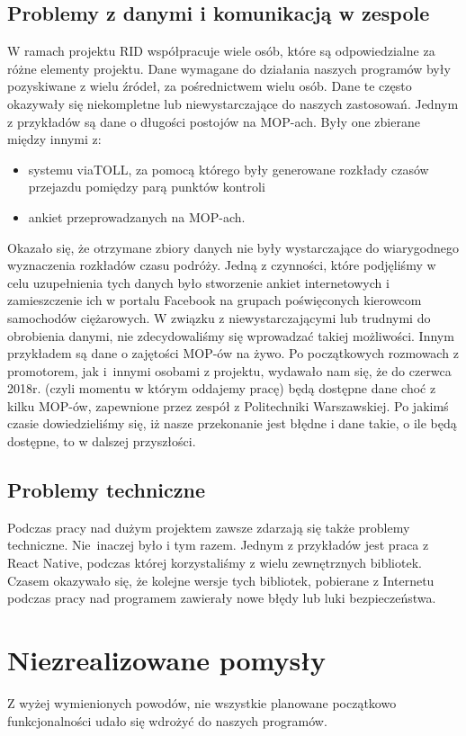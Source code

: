 \subsection{Problemy z danymi i komunikacją w zespole}
W ramach projektu RID współpracuje wiele osób, które są odpowiedzialne za różne elementy projektu. 
Dane wymagane do działania naszych programów były pozyskiwane z wielu źródeł, za pośrednictwem wielu osób. Dane te często okazywały się niekompletne lub niewystarczające do naszych zastosowań.
Jednym z przykładów są dane o długości postojów na MOP-ach. Były one zbierane między innymi z:
\begin{itemize}
\item systemu viaTOLL, za pomocą którego były generowane rozkłady czasów przejazdu pomiędzy parą punktów kontroli
\item ankiet przeprowadzanych na MOP-ach. 
\end{itemize}
Okazało się, że otrzymane zbiory danych nie były wystarczające do wiarygodnego wyznaczenia rozkładów czasu podróży. Jedną z czynności, które podjęliśmy w celu uzupełnienia tych danych było stworzenie ankiet internetowych i zamieszczenie ich w portalu Facebook na grupach poświęconych kierowcom samochodów ciężarowych. W związku z niewystarczającymi lub trudnymi do obrobienia danymi, nie zdecydowaliśmy się wprowadzać takiej możliwości.
Innym przykładem są dane o zajętości MOP-ów na żywo. Po początkowych rozmowach z promotorem, jak i~innymi osobami z projektu, wydawało nam się, że do czerwca 2018r. (czyli momentu w którym oddajemy pracę) będą dostępne dane choć z kilku MOP-ów, zapewnione przez zespół z Politechniki Warszawskiej. Po jakimś czasie dowiedzieliśmy się, iż nasze przekonanie jest błędne i dane takie, o ile będą dostępne, to w dalszej przyszłości.
\subsection{Problemy techniczne}
Podczas pracy nad dużym projektem zawsze zdarzają się także problemy techniczne. Nie~inaczej było i tym razem. 
Jednym z przykładów jest praca z React Native, podczas której korzystaliśmy z wielu zewnętrznych bibliotek. Czasem okazywało się, że kolejne wersje tych bibliotek, pobierane z Internetu podczas pracy nad programem zawierały nowe błędy lub luki bezpieczeństwa.

\section{Niezrealizowane pomysły}
Z wyżej wymienionych powodów, nie wszystkie planowane początkowo funkcjonalności udało się wdrożyć do naszych programów.
